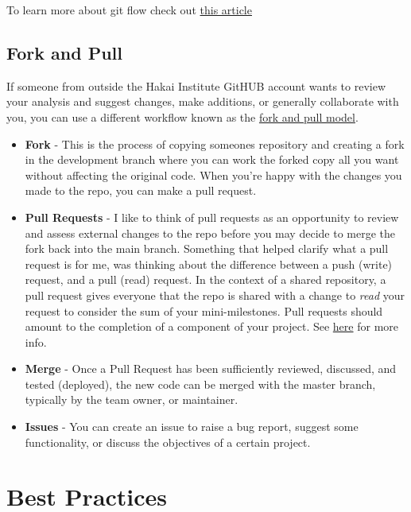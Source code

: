 \documentclass[]{book}
\begin{document}
To learn more about git flow check out
\href{https://www.atlassian.com/git/tutorials/comparing-workflows\#gitflow-workflow}{this
article}

\subsection{Fork and Pull}\label{fork-and-pull}

If someone from outside the Hakai Institute GitHUB account wants to
review your analysis and suggest changes, make additions, or generally
collaborate with you, you can use a different workflow known as the
\href{https://www.atlassian.com/blog/git/git-branching-and-forking-in-the-enterprise-why-fork}{fork
and pull model}.

\begin{itemize}
\item
  \textbf{Fork} - This is the process of copying someones repository and
  creating a fork in the development branch where you can work the
  forked copy all you want without affecting the original code. When
  you're happy with the changes you made to the repo, you can make a
  pull request.
\item
  \textbf{Pull Requests} - I like to think of pull requests as an
  opportunity to review and assess external changes to the repo before
  you may decide to merge the fork back into the main branch. Something
  that helped clarify what a pull request is for me, was thinking about
  the difference between a push (write) request, and a pull (read)
  request. In the context of a shared repository, a pull request gives
  everyone that the repo is shared with a change to \emph{read} your
  request to consider the sum of your mini-milestones. Pull requests
  should amount to the completion of a component of your project. See
  \href{https://help.github.com/articles/about-pull-requests/}{here} for
  more info.
\item
  \textbf{Merge} - Once a Pull Request has been sufficiently reviewed,
  discussed, and tested (deployed), the new code can be merged with the
  master branch, typically by the team owner, or maintainer.
\item
  \textbf{Issues} - You can create an issue to raise a bug report,
  suggest some functionality, or discuss the objectives of a certain
  project.
\end{itemize}

\section{Best Practices}\label{best-practices}
\end{document}

